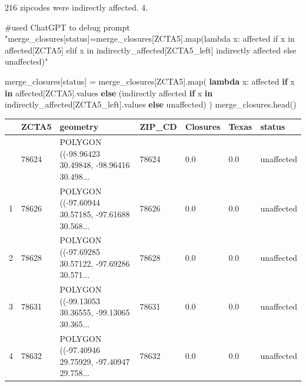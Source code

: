 \documentclass[
  letterpaper,
  DIV=11,
  numbers=noendperiod]{scrartcl}
\newenvironment{Shaded}{\begin{snugshade}}{\end{snugshade}}
\newcommand{\BuiltInTok}[1]{\textcolor[rgb]{0.00,0.23,0.31}{#1}}
\newcommand{\CommentTok}[1]{\textcolor[rgb]{0.37,0.37,0.37}{#1}}
\newcommand{\ControlFlowTok}[1]{\textcolor[rgb]{0.00,0.23,0.31}{\textbf{#1}}}
\newcommand{\KeywordTok}[1]{\textcolor[rgb]{0.00,0.23,0.31}{\textbf{#1}}}
\newcommand{\NormalTok}[1]{\textcolor[rgb]{0.00,0.23,0.31}{#1}}
\newcommand{\OperatorTok}[1]{\textcolor[rgb]{0.37,0.37,0.37}{#1}}
\newcommand{\StringTok}[1]{\textcolor[rgb]{0.13,0.47,0.30}{#1}}
\begin{document}
216 zipcodes were indirectly affected. 4.

\begin{Shaded}
\begin{Highlighting}[]
\CommentTok{\#used ChatGPT to debug prompt "merge\_closures[\textquotesingle{}status\textquotesingle{}]=merge\_closures[\textquotesingle{}ZCTA5\textquotesingle{}].map(lambda x: \textquotesingle{}affected\textquotesingle{} if x in affected[\textquotesingle{}ZCTA5\textquotesingle{}] elif x in indirectly\_affected[ZCTA5\_left] \textquotesingle{}indirectly affected\textquotesingle{} else \textquotesingle{}unaffected\textquotesingle{})"}

\NormalTok{merge\_closures[}\StringTok{\textquotesingle{}status\textquotesingle{}}\NormalTok{] }\OperatorTok{=}\NormalTok{ merge\_closures[}\StringTok{\textquotesingle{}ZCTA5\textquotesingle{}}\NormalTok{].}\BuiltInTok{map}\NormalTok{(}
    \KeywordTok{lambda}\NormalTok{ x: }\StringTok{\textquotesingle{}affected\textquotesingle{}} \ControlFlowTok{if}\NormalTok{ x }\KeywordTok{in}\NormalTok{ affected[}\StringTok{\textquotesingle{}ZCTA5\textquotesingle{}}\NormalTok{].values }
    \ControlFlowTok{else}\NormalTok{ (}\StringTok{\textquotesingle{}indirectly affected\textquotesingle{}} \ControlFlowTok{if}\NormalTok{ x }\KeywordTok{in}\NormalTok{ indirectly\_affected[}\StringTok{\textquotesingle{}ZCTA5\_left\textquotesingle{}}\NormalTok{].values }
          \ControlFlowTok{else} \StringTok{\textquotesingle{}unaffected\textquotesingle{}}\NormalTok{)}
\NormalTok{)}
\NormalTok{merge\_closures.head()}
\end{Highlighting}
\end{Shaded}

\begin{longtable}[]{@{}lllllll@{}}
\toprule\noalign{}
& ZCTA5 & geometry & ZIP\_CD & Closures & Texas & status \\
\midrule\noalign{}
\endhead
\bottomrule\noalign{}
\endlastfoot
0 & 78624 & POLYGON ((-98.96423 30.49848, -98.96416 30.498... & 78624 &
0.0 & 0.0 & unaffected \\
1 & 78626 & POLYGON ((-97.60944 30.57185, -97.61688 30.568... & 78626 &
0.0 & 0.0 & unaffected \\
2 & 78628 & POLYGON ((-97.69285 30.57122, -97.69286 30.571... & 78628 &
0.0 & 0.0 & unaffected \\
3 & 78631 & POLYGON ((-99.13053 30.36555, -99.13065 30.365... & 78631 &
0.0 & 0.0 & unaffected \\
4 & 78632 & POLYGON ((-97.40946 29.75929, -97.40947 29.758... & 78632 &
0.0 & 0.0 & unaffected \\
\end{longtable}
\end{document}
